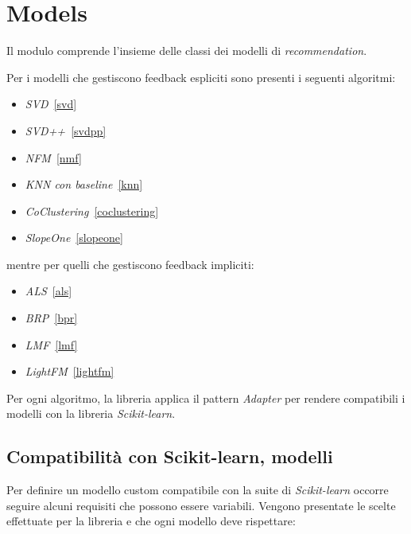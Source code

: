 \section{Models}
Il modulo comprende l'insieme delle classi dei modelli di \textit{recommendation}.

Per i modelli che gestiscono feedback espliciti sono presenti i seguenti algoritmi:

\begin{itemize}
    \item \textit{SVD}~\ref{svd}
    \item \textit{SVD++}~\ref{svdpp}
    \item \textit{NFM}~\ref{nmf}
    \item \textit{KNN con baseline}~\ref{knn}
    \item \textit{CoClustering}~\ref{coclustering}
    \item \textit{SlopeOne}~\ref{slopeone}
\end{itemize}

mentre per quelli che gestiscono feedback impliciti:

\begin{itemize}
    \item \textit{ALS}~\ref{als} 
    \item \textit{BRP}~\ref{bpr} 
    \item \textit{LMF}~\ref{lmf}
    \item \textit{LightFM}~\ref{lightfm}  
\end{itemize}

Per ogni algoritmo, la libreria applica il pattern \textit{Adapter} per rendere compatibili i modelli con la libreria \textit{Scikit-learn}.

\subsection{Compatibilità con Scikit-learn, modelli}\label{compatibilita_sklearn}

Per definire un modello custom compatibile con la suite di \textit{Scikit-learn} occorre seguire alcuni requisiti che possono essere variabili. Vengono presentate le scelte effettuate per la libreria e che ogni modello deve rispettare:

